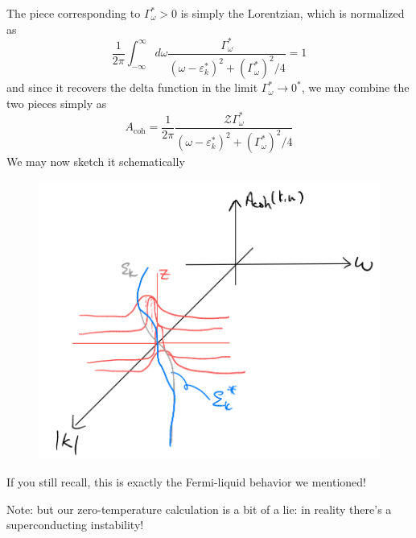 The piece corresponding to $\Gamma_\omega^*>0$ is simply the Lorentzian, which is normalized as
\[ \frac{1}{2\pi}\int_{-\infty}^{\infty}{d\omega \frac{\Gamma _{\omega}^{*}}{\left( \omega -\varepsilon _{k}^{*} \right) ^2+\left( \Gamma _{\omega}^{*} \right) ^2/4}}=1\]
and since it recovers the delta function in the limit $\Gamma _{\omega}^{*}\rightarrow 0^*$, we may combine the two pieces simply as
\[ A_{\mathrm{coh}}=\frac{1}{2\pi}\frac{\mathcal{Z} \Gamma _{\omega}^{*}}{\left( \omega -\varepsilon _{k}^{*} \right) ^2+\left( \Gamma _{\omega}^{*} \right) ^2/4}\]
We may now sketch it schematically
\begin{figure}[H]
    \centering
    \includegraphics[width=\textwidth]{jupyterbook/data/fig/lec24-fig03.png}
\end{figure}
If you still recall, this is exactly the Fermi-liquid behavior we mentioned!

Note: but our zero-temperature calculation is a bit of a lie: in reality there's a superconducting instability!

